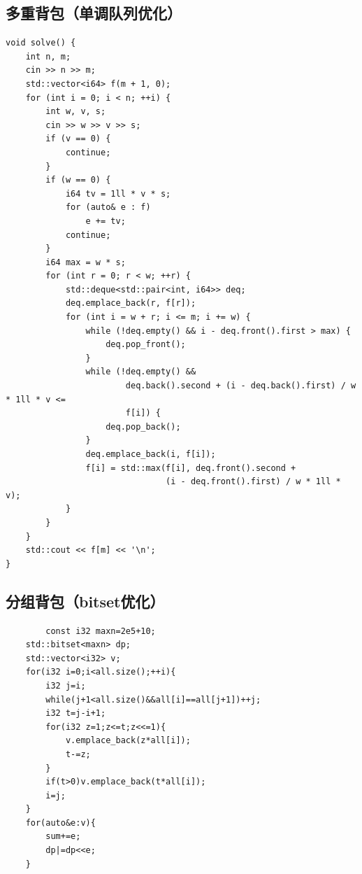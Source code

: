 \documentclass[UTF8,twoside]{ctexart}
\begin{document}
\subsection{多重背包（单调队列优化）}
\begin{lstlisting}
void solve() {
    int n, m;
    cin >> n >> m;
    std::vector<i64> f(m + 1, 0);
    for (int i = 0; i < n; ++i) {
        int w, v, s;
        cin >> w >> v >> s;
        if (v == 0) {
            continue;
        }
        if (w == 0) {
            i64 tv = 1ll * v * s;
            for (auto& e : f)
                e += tv;
            continue;
        }
        i64 max = w * s;
        for (int r = 0; r < w; ++r) {
            std::deque<std::pair<int, i64>> deq;
            deq.emplace_back(r, f[r]);
            for (int i = w + r; i <= m; i += w) {
                while (!deq.empty() && i - deq.front().first > max) {
                    deq.pop_front();
                }
                while (!deq.empty() &&
                        deq.back().second + (i - deq.back().first) / w * 1ll * v <=
                        f[i]) {
                    deq.pop_back();
                }
                deq.emplace_back(i, f[i]);
                f[i] = std::max(f[i], deq.front().second +
                                (i - deq.front().first) / w * 1ll * v);
            }
        }
    }
    std::cout << f[m] << '\n';
}
\end{lstlisting}
\subsection{分组背包（bitset优化）}
\begin{lstlisting}
        const i32 maxn=2e5+10;
    std::bitset<maxn> dp;
    std::vector<i32> v;
    for(i32 i=0;i<all.size();++i){
        i32 j=i;
        while(j+1<all.size()&&all[i]==all[j+1])++j;
        i32 t=j-i+1;
        for(i32 z=1;z<=t;z<<=1){
            v.emplace_back(z*all[i]);
            t-=z;
        }
        if(t>0)v.emplace_back(t*all[i]);
        i=j;
    }
    for(auto&e:v){
        sum+=e;
        dp|=dp<<e;
    }
\end{lstlisting}
\end{document}
